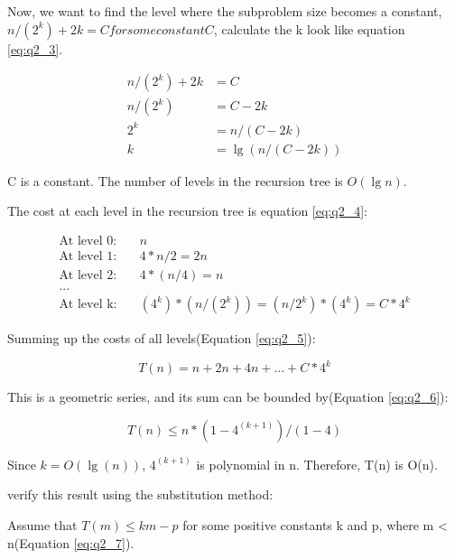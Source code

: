 \documentclass{article}
\begin{document}
  Now, we want to find the level where the subproblem size becomes a constant, $ n/(2^k) + 2k = C for some constant C $, calculate the k look like equation \eqref{eq:q2_3}.

  \begin{equation}
    \begin{aligned}
      n/(2^k) + 2k &= C \\
      n/(2^k) &= C - 2k \\
      2^k &= n/(C - 2k) \\
      k &= \lg (n/(C - 2k))
    \end{aligned}
    \label{eq:q2_3}
  \end{equation}

  C is a constant. The number of levels in the recursion tree is $ O(\lg n) $.

  The cost at each level in the recursion tree is equation \eqref{eq:q2_4}:

  \begin{equation}
    \begin{aligned}
      \text{At level 0:}& \quad n \\
      \text{At level 1:}& \quad 4 * n/2 = 2n \\
      \text{At level 2:}& \quad 4 * (n/4) = n \\
      ... \\
      \text{At level k:}& \quad (4^k) * (n/(2^k)) = (n/2^k) * (4^k) = C * 4^k
    \end{aligned}
    \label{eq:q2_4}
  \end{equation}

  Summing up the costs of all levels(Equation \eqref{eq:q2_5}):

  \begin{equation}
    T(n) = n + 2n + 4n + ... + C * 4^k
    \label{eq:q2_5}
  \end{equation}

  This is a geometric series, and its sum can be bounded by(Equation \eqref{eq:q2_6}):

  \begin{equation}
    T(n) \leq  n * (1 - 4^(k+1))/(1 - 4)
    \label{eq:q2_6}
  \end{equation}

  Since $k = O(\lg(n))$, $4^(k+1)$ is polynomial in n. Therefore, T(n) is O(n).

  verify this result using the substitution method:

  Assume that $T(m) \leq  km - p$ for some positive constants k and p, where m < n(Equation \eqref{eq:q2_7}).
\end{document}
